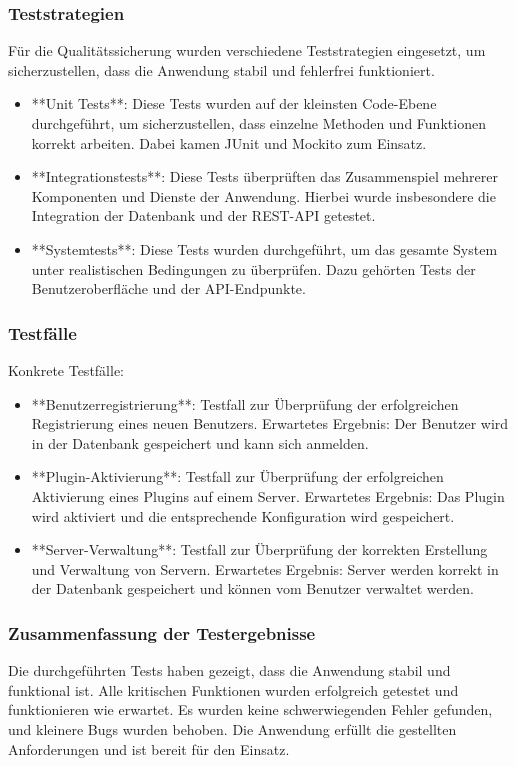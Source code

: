 \subsubsection{Teststrategien}\label{teststrategien}

Für die Qualitätssicherung wurden verschiedene Teststrategien eingesetzt, um sicherzustellen, dass die Anwendung stabil und fehlerfrei funktioniert.

\begin{itemize}
  \item
        **Unit Tests**: Diese Tests wurden auf der kleinsten Code-Ebene durchgeführt, um sicherzustellen, dass einzelne Methoden und Funktionen korrekt arbeiten. Dabei kamen JUnit und Mockito zum Einsatz.
  \item
        **Integrationstests**: Diese Tests überprüften das Zusammenspiel mehrerer Komponenten und Dienste der Anwendung. Hierbei wurde insbesondere die Integration der Datenbank und der REST-API getestet.
  \item
        **Systemtests**: Diese Tests wurden durchgeführt, um das gesamte System unter realistischen Bedingungen zu überprüfen. Dazu gehörten Tests der Benutzeroberfläche und der API-Endpunkte.
\end{itemize}

\subsubsection{Testfälle}\label{testfuxe4lle}

Konkrete Testfälle:

\begin{itemize}
  \item
        **Benutzerregistrierung**: Testfall zur Überprüfung der erfolgreichen Registrierung eines neuen Benutzers. Erwartetes Ergebnis: Der Benutzer wird in der Datenbank gespeichert und kann sich anmelden.
  \item
        **Plugin-Aktivierung**: Testfall zur Überprüfung der erfolgreichen Aktivierung eines Plugins auf einem Server. Erwartetes Ergebnis: Das Plugin wird aktiviert und die entsprechende Konfiguration wird gespeichert.
  \item
        **Server-Verwaltung**: Testfall zur Überprüfung der korrekten Erstellung und Verwaltung von Servern. Erwartetes Ergebnis: Server werden korrekt in der Datenbank gespeichert und können vom Benutzer verwaltet werden.
\end{itemize}

\subsubsection{Zusammenfassung der Testergebnisse}

Die durchgeführten Tests haben gezeigt, dass die Anwendung stabil und funktional ist. Alle kritischen Funktionen wurden erfolgreich getestet und funktionieren wie erwartet. Es wurden keine schwerwiegenden Fehler gefunden, und kleinere Bugs wurden behoben. Die Anwendung erfüllt die gestellten Anforderungen und ist bereit für den Einsatz.

